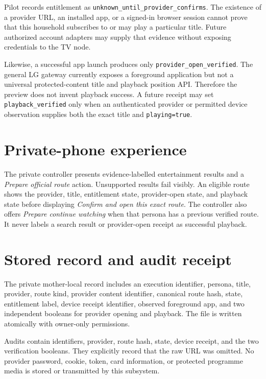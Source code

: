 \documentclass[11pt,a4paper]{article}
\begin{document}
Pilot records entitlement as
\texttt{unknown\_until\_provider\_confirms}.  The existence of a provider URL,
an installed app, or a signed-in browser session cannot prove that this household
subscribes to or may play a particular title.  Future authorized account adapters
may supply that evidence without exposing credentials to the TV node.

Likewise, a successful app launch produces only
\texttt{provider\_open\_verified}.  The general LG gateway currently exposes a
foreground application but not a universal protected-content title and playback
position API.  Therefore the preview does not invent playback success.  A future
receipt may set \texttt{playback\_verified} only when an authenticated provider
or permitted device observation supplies both the exact title and
\texttt{playing=true}.

\section{Private-phone experience}

The private controller presents evidence-labelled entertainment results and a
\emph{Prepare official route} action.  Unsupported results fail visibly.  An
eligible route shows the provider, title, entitlement state, provider-open state,
and playback state before displaying \emph{Confirm and open this exact route}.
The controller also offers \emph{Prepare continue watching} when that persona
has a previous verified route.  It never labels a search result or provider-open
receipt as successful playback.

\section{Stored record and audit receipt}

The private mother-local record includes an execution identifier, persona,
title, provider, route kind, provider content identifier, canonical route hash,
state, entitlement label, device receipt identifier, observed foreground app,
and two independent booleans for provider opening and playback.  The file is
written atomically with owner-only permissions.

Audits contain identifiers, provider, route hash, state, device receipt, and the
two verification booleans.  They explicitly record that the raw URL was omitted.
No provider password, cookie, token, card information, or protected programme
media is stored or transmitted by this subsystem.
\end{document}
